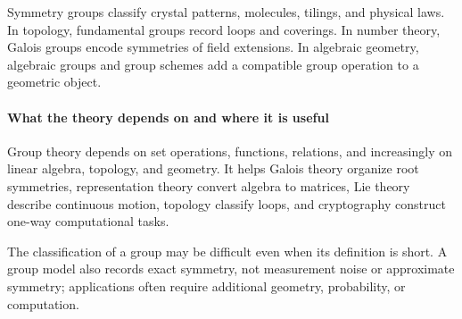 Symmetry groups classify crystal patterns, molecules, tilings, and physical laws. In topology, fundamental groups record loops and coverings. In number theory, Galois groups encode symmetries of field extensions. In algebraic geometry, algebraic groups and group schemes add a compatible group operation to a geometric object.

\paragraph{What the theory depends on and where it is useful}
Group theory depends on set operations, functions, relations, and increasingly on linear algebra, topology, and geometry. It helps Galois theory organize root symmetries, representation theory convert algebra to matrices, Lie theory describe continuous motion, topology classify loops, and cryptography construct one-way computational tasks.

The classification of a group may be difficult even when its definition is short. A group model also records exact symmetry, not measurement noise or approximate symmetry; applications often require additional geometry, probability, or computation.

